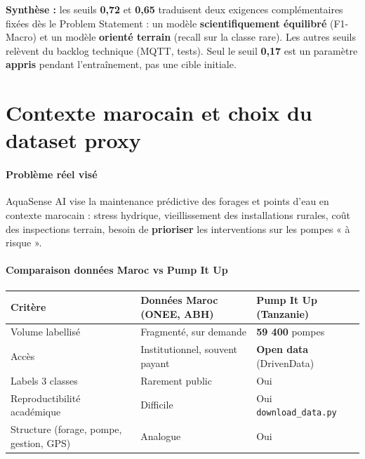 \documentclass[11pt,a4paper]{report}
\begin{document}
\textbf{Synthèse :} les seuils \textbf{0,72} et \textbf{0,65} traduisent deux exigences complémentaires fixées dès le Problem Statement : un modèle \textbf{scientifiquement équilibré} (F1-Macro) et un modèle \textbf{orienté terrain} (recall sur la classe rare). Les autres seuils relèvent du backlog technique (MQTT, tests). Seul le seuil \textbf{0,17} est un paramètre \textbf{appris} pendant l'entraînement, pas une cible initiale.





\chapter{Contexte marocain et choix du dataset proxy}



\subsubsection{Problème réel visé}



AquaSense AI vise la maintenance prédictive des forages et points d'eau en contexte marocain : stress hydrique, vieillissement des installations rurales, coût des inspections terrain, besoin de \textbf{prioriser} les interventions sur les pompes « à risque ».



\subsubsection{Comparaison données Maroc vs Pump It Up}



\begin{longtable}{@{}lll@{}}
\toprule
Critère & Données Maroc (ONEE, ABH) & Pump It Up (Tanzanie) \\
\midrule
Volume labellisé & Fragmenté, sur demande & \textbf{59 400} pompes \\
Accès & Institutionnel, souvent payant & \textbf{Open data} (DrivenData) \\
Labels 3 classes & Rarement public & Oui \\
Reproductibilité académique & Difficile & Oui \texttt{download\_data.py} \\
Structure (forage, pompe, gestion, GPS) & Analogue & Oui \\
\bottomrule
\end{longtable}
\end{document}
